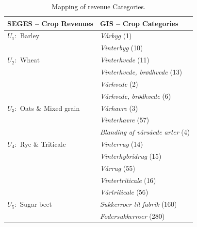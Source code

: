 \documentclass[12pt]{article}
\begin{document}
\begingroup
\fontsize{8.5}{10}\selectfont
\renewcommand{\arraystretch}{1.5}
\begin{longtable}{l | p{9cm}}
\caption{Mapping of revenue Categories.}
\label{tab:mapping-yields-crops} \\
\toprule
\textbf{SEGES -- Crop Revenues} & \textbf{GIS -- Crop Categories} \\
\midrule
\endfirsthead

 
\bottomrule
\endfoot
 
$U_1:$ Barley
       & \textit{Vårbyg} (1) \\
       & \textit{Vinterbyg} (10) \\ \midrule
 
$U_2:$ Wheat
       & \textit{Vinterhvede} (11) \\
       & \textit{Vinterhvede, brødhvede} (13) \\
       & \textit{Vårhvede} (2) \\
       & \textit{Vårhvede, brødhvede} (6) \\ \midrule
 
$U_3:$ Oats \& Mixed grain
       & \textit{Vårhavre} (3) \\
       & \textit{Vinterhavre} (57) \\
       & \textit{Blanding af vårsåede arter} (4) \\ \midrule
 
$U_4:$ Rye \& Triticale
       & \textit{Vinterrug} (14) \\
       & \textit{Vinterhybridrug} (15) \\
       & \textit{Vårrug} (55) \\
       & \textit{Vintertriticale} (16) \\
       & \textit{Vårtriticale} (56) \\ \midrule
 
$U_5:$ Sugar beet
       & \textit{Sukkerroer til fabrik} (160) \\
       & \textit{Fodersukkerroer} (280) \\ \midrule
 

\end{longtable}
\end{document}
